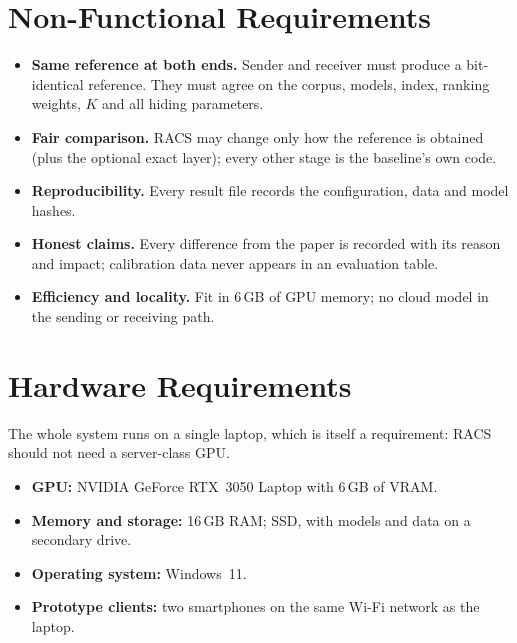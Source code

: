 \section{Non-Functional Requirements}
\begin{itemize}
	\item \textbf{Same reference at both ends.} Sender and receiver must produce a bit-identical
	reference. They must agree on the corpus, models, index, ranking weights, $K$ and all hiding
	parameters.
	\item \textbf{Fair comparison.} RACS may change only how the reference is obtained (plus the
	optional exact layer); every other stage is the baseline's own code.
	\item \textbf{Reproducibility.} Every result file records the configuration, data and model
	hashes.
	\item \textbf{Honest claims.} Every difference from the paper is recorded with its reason and
	impact; calibration data never appears in an evaluation table.
	\item \textbf{Efficiency and locality.} Fit in 6\,GB of GPU memory; no cloud model in the
	sending or receiving path.
\end{itemize}

\section{Hardware Requirements}
The whole system runs on a single laptop, which is itself a requirement: RACS should not need a
server-class GPU.
\begin{itemize}
	\item \textbf{GPU:} NVIDIA GeForce RTX~3050 Laptop with 6\,GB of VRAM.
	\item \textbf{Memory and storage:} 16\,GB RAM; SSD, with models and data on a secondary drive.
	\item \textbf{Operating system:} Windows~11.
	\item \textbf{Prototype clients:} two smartphones on the same Wi-Fi network as the laptop.
\end{itemize}


